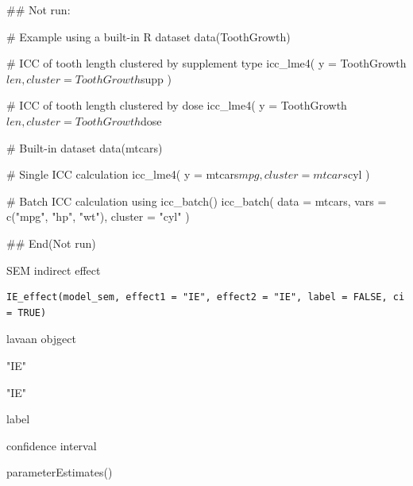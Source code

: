 \documentclass[a4paper]{book}
\begin{document}
%
\begin{Examples}
\begin{ExampleCode}
\#\# Not run: 

# Example using a built-in R dataset
data(ToothGrowth)

# ICC of tooth length clustered by supplement type
icc_lme4(
  y = ToothGrowth$len,
  cluster = ToothGrowth$supp
)

# ICC of tooth length clustered by dose
icc_lme4(
  y = ToothGrowth$len,
  cluster = ToothGrowth$dose


# Built-in dataset
data(mtcars)

# Single ICC calculation
icc_lme4(
  y = mtcars$mpg,
  cluster = mtcars$cyl
)

# Batch ICC calculation using icc_batch()
icc_batch(
  data = mtcars,
  vars = c("mpg", "hp", "wt"),
  cluster = "cyl"
)

## End(Not run)
\end{ExampleCode}
\end{Examples}
%
\begin{Description}
SEM indirect effect
\end{Description}
%
\begin{Usage}
\begin{verbatim}
IE_effect(model_sem, effect1 = "IE", effect2 = "IE", label = FALSE, ci = TRUE)
\end{verbatim}
\end{Usage}
%
\begin{Arguments}
\begin{ldescription}
\item[\code{model\_sem}] lavaan objgect

\item[\code{effect1}] "IE"

\item[\code{effect2}] "IE"

\item[\code{label}] label

\item[\code{ci}] confidence interval
\end{ldescription}
\end{Arguments}
%
\begin{Value}
parameterEstimates()
\end{Value}
%
\end{document}
